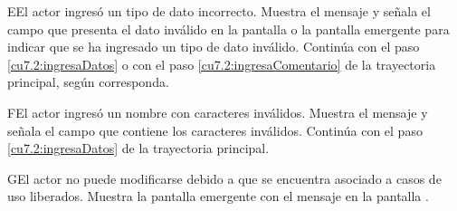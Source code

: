  \begin{UCtrayectoriaA}{E}{El actor ingresó un tipo de dato incorrecto.}
    \UCpaso[\UCsist] Muestra el mensaje  y señala el campo que presenta el dato inválido en la 
    pantalla  o la pantalla emergente  para indicar que se ha ingresado un tipo de dato inválido.
    \UCpaso[] Continúa con el paso \ref{cu7.2:ingresaDatos} o con el paso \ref{cu7.2:ingresaComentario} de la trayectoria principal, según corresponda.
 \end{UCtrayectoriaA}
 
 \begin{UCtrayectoriaA}{F}{El actor ingresó un nombre con caracteres inválidos.}
    \UCpaso[\UCsist] Muestra el mensaje  y señala el campo que contiene los caracteres inválidos.
    \UCpaso[] Continúa con el paso \ref{cu7.2:ingresaDatos} de la trayectoria principal.
 \end{UCtrayectoriaA}
 \begin{UCtrayectoriaA}{G}{El actor no puede modificarse debido a que se encuentra asociado a casos de uso liberados.}
    \UCpaso[\UCsist] Muestra la pantalla emergente con el mensaje  en la pantalla .
 \end{UCtrayectoriaA}
